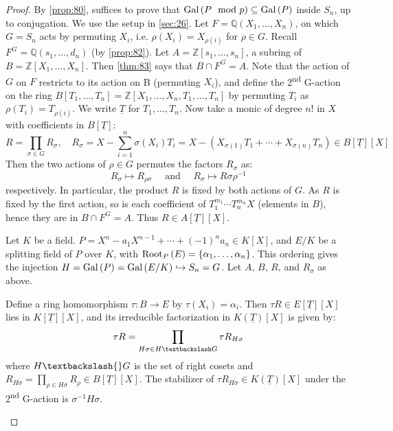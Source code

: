 \begin{proof}
  By \autoref{prop:80}, suffices to prove that $\operatorname{Gal}\left(P \mod p\right) \subseteq \operatorname{Gal}\left(P\right)$ inside $S_n$, up to conjugation. We use the setup in \autoref{sec:26}. Let $F = \mathbb{Q}(X_1, \ldots, X_n)$, on which $G = S_n$ acts by permuting $X_i$, i.e. $\rho(X_i) = X_{\rho(i)}$ for $\rho \in G$. Recall $F^G = \mathbb{Q}(s_1, \ldots, d_n)$ (by \autoref{prop:82}). Let $A = \mathbb{Z}[s_1, \ldots, s_n]$, a subring of $B = \mathbb{Z}[X_1, \ldots, X_n]$. Then \autoref{thm:83} says that $B \cap F^G = A$. Note that the action of $G$ on $F$ restricts to its action on B (permuting $X_i$), and define the 2\textsuperscript{nd} G-action on the ring $B[T_1, \ldots, T_n] = \mathbb{Z}[X_1, \ldots, X_n, T_1, \ldots, T_n]$ by permuting $T_i$ as $\rho(T_i) = T_{\rho(i)}$. We write $\underline{T}$ for $T_1, \ldots, T_n$. Now take a monic of degree $n!$ in $X$ with coefficients in $B[\underline{T}]$:
\[
R = \prod_{\sigma \in G}R_\sigma, \quad R_\sigma = X - \sum_{i=1}^n\sigma(X_i)T_i = X-(X_{\sigma(1)}T_1 + \cdots + X_{\sigma(n)}T_n) \in B[\underline{T}][X]
\]
Then the two actions of $\rho \in G$ permutes the factors $R_\sigma$ as:
\[
R_\sigma \mapsto R_{\rho\sigma} \quad \text{ and } \quad R_\sigma \mapsto R{\sigma\rho^{-1}}
\]
respectively. In particular, the product $R$ is fixed by both actions of $G$. As $R$ is fixed by the first action, so is each coefficient of $T_1^{m_1}\cdots{}T_n^{m_n}X$ (elements in $B$), hence they are in $B \cap F^G = A$. Thus $R \in A[\underline{T}][X]$.

\begin{lemma}
  \label{lemma:85}
  Let $K$ be a field. $ P = X^n - a_1X^{n-1} + \cdots + (-1)^na_n \in K[X]$, and $E/K$ be a splitting field of $P$ over $K$, with $\operatorname{Root}_{P}\left(E\right) = \{ \alpha_1, \ldots, \alpha_n \}$. This ordering gives the injection $H = \operatorname{Gal}\left(P\right) = \operatorname{Gal}\left(E/K\right) \hookrightarrow S_n = G$. Let $A$, $B$, $R$, and $R_\sigma$ as above.

Define a ring homomorphism $\tau : B \rightarrow E$ by $\tau(X_i) = \alpha_i$. Then $\tau{}R \in E[\underline{T}][X]$ lies in $K[\underline{T}][X]$, and its irreducible factorization in $K(\underline{T})[X]$ is given by:
\[
\tau{}R  = \prod_{H\sigma \in H \textbackslash G} \tau{}R_{H\sigma}
\]
where $H\textbackslash{}G$ is the set of right cosets and $R_{H\sigma} = \prod_{\rho \in H\sigma} R_\rho \in B[\underline{T}][X]$. The stabilizer of $\tau{}R_{H\sigma} \in K(\underline{T})[X]$ under the 2\textsuperscript{nd} G-action is $\sigma^{-1}H\sigma$.
\end{lemma}


\end{proof}
